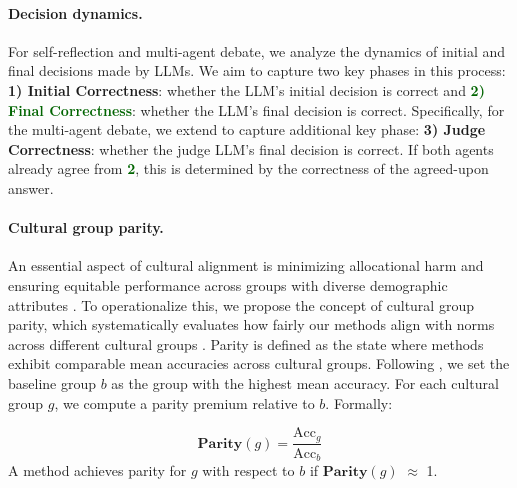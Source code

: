 \paragraph{Decision dynamics.}
For self-reflection and multi-agent debate, we analyze the dynamics of initial and final decisions made by LLMs. We aim to capture two key phases in this process: \textbf{\textcolor{darkpurple}{1) Initial Correctness}}: whether the LLM's initial decision is correct and \textbf{\textcolor{darkgreen}{2) Final Correctness}}: whether the LLM's final decision is correct. Specifically, for the multi-agent debate, we extend to capture additional key phase: \textbf{\textcolor{bblue}{3) Judge Correctness}}: whether the judge LLM's final decision is correct. If both agents already agree from \textbf{\textcolor{darkgreen}{2}}, this is determined by the correctness of the agreed-upon answer.



\paragraph{Cultural group parity.}
An essential aspect of cultural alignment is minimizing allocational harm and ensuring equitable performance across groups with diverse demographic attributes \cite{ramesh-etal-2023-fairness}. To operationalize this, we propose the concept of cultural group parity, which systematically evaluates how fairly our methods align with norms across different cultural groups \cite{wang-etal-2022-assessing}. Parity is defined as the state where methods exhibit comparable mean accuracies across cultural groups. Following \citet{petrov2023languagemodeltokenizersintroduce}, we set the baseline group $b$ as the group with the highest mean accuracy. For each cultural group $g$, we compute a parity premium relative to $b$. Formally:

\begin{equation}
    \mathbf{Parity}(g) = \frac{\mathrm{Acc}_g}{\mathrm{Acc}_b}
\end{equation}
A method achieves parity for $g$ with respect to $b$ if $\mathbf{Parity}(g)$ $\approx$ 1.
